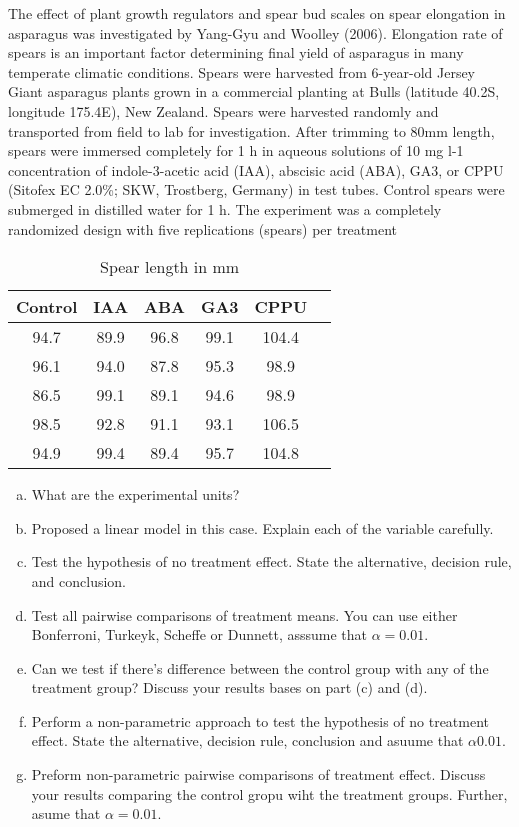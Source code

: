 \documentclass{article}
\begin{document}
The effect of plant growth regulators and spear bud scales on spear elongation in asparagus
was investigated by Yang-Gyu and Woolley (2006). Elongation rate of spears is an important factor
determining final yield of asparagus in many temperate climatic conditions. Spears were harvested
from 6-year-old Jersey Giant asparagus plants grown in a commercial planting at Bulls (latitude 40.2S,
longitude 175.4E), New Zealand. Spears were harvested randomly and transported from field to lab
for investigation. After trimming to 80mm length, spears were immersed completely for 1 h in aqueous
solutions of 10 mg l-1 concentration of indole-3-acetic acid (IAA), abscisic acid (ABA), GA3, or CPPU
(Sitofex EC 2.0\%; SKW, Trostberg, Germany) in test tubes. Control spears were submerged in distilled
water for 1 h. The experiment was a completely randomized design with five replications (spears) per
treatment
\begin{table}[!ht]
	\centering
	\caption{Spear length in mm}
	\begin{tabular}{c c c c c c}
		\hline
		\textbf{Control} & \textbf{IAA} & \textbf{ABA} & \textbf{GA3} & \textbf{CPPU} \\
		\hline
		94.7             & 89.9         & 96.8         & 99.1         & 104.4         \\
		96.1             & 94.0         & 87.8         & 95.3         & 98.9          \\
		86.5             & 99.1         & 89.1         & 94.6         & 98.9          \\
		98.5             & 92.8         & 91.1         & 93.1         & 106.5         \\
		94.9             & 99.4         & 89.4         & 95.7         & 104.8         \\
		\hline
	\end{tabular}
\end{table}

\begin{enumerate}[(a)]
	\item What are the experimental units?
	\item Proposed a linear model in this case. Explain each of the variable carefully.
	\item Test the hypothesis of no treatment effect. State the alternative, decision rule, and conclusion.
	\item Test all pairwise comparisons of treatment means. You can use either Bonferroni, Turkeyk, Scheffe or Dunnett, asssume that $\alpha = 0.01$.
	\item Can we test if there's difference between the control group with any of the treatment group? Discuss your results bases on part (c) and (d).
	\item Perform a non-parametric approach to test the hypothesis of no treatment effect. State the alternative, decision rule, conclusion and asuume that $\alpha 0.01$.
	\item Preform non-parametric pairwise comparisons of treatment effect. Discuss your results comparing the control gropu wiht the treatment groups.
	      Further, asume that $\alpha = 0.01$.
\end{enumerate}
\end{document}
